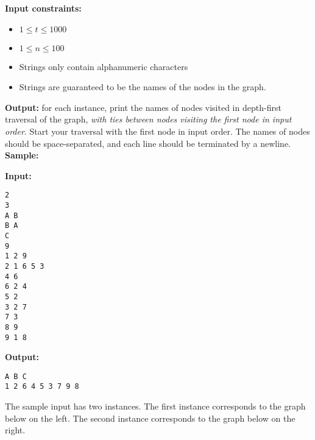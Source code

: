 \documentclass[answers]{exam}  %
\begin{document}
\begin{questions}
\textbf{Input constraints:}
\begin{itemize}
    \item $1 \leq t \leq 1000$
    \item $1 \leq n \leq 100$
    \item Strings only contain alphanumeric characters
    \item Strings are guaranteed to be the names of the nodes in the graph.
\end{itemize}

\textbf{Output:} for each instance, print the names of nodes visited in depth-first traversal of the graph, \emph{with ties between nodes visiting the first node in input order}. Start your traversal with the first node in input order. The names of nodes should be space-separated, and each line should be terminated by a newline.\\

\textbf{Sample:}
\begin{multicols}{2}
\textbf{Input:} 
\begin{verbatim}
2
3
A B
B A
C
9
1 2 9
2 1 6 5 3
4 6
6 2 4
5 2
3 2 7
7 3
8 9
9 1 8
\end{verbatim}
\columnbreak
\textbf{Output:} 
\begin{verbatim}
A B C
1 2 6 4 5 3 7 9 8
\end{verbatim}
\end{multicols}

The sample input has two instances. 
The first instance corresponds to the graph below on the left. 
The second instance corresponds to the graph below on the right.
\begin{center}
\begin{minipage}{0.3\linewidth}
\end{minipage}
\qquad\qquad
\begin{minipage}{0.3\linewidth}
\end{minipage}

\hfill
\end{center}

\end{questions}
\end{document}
